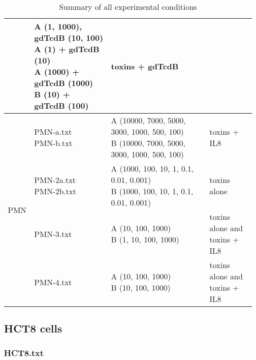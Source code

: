 \begin{table*}[t!]
\begin{center}
\begin{tabular}{ l l l l }
                          & \specialcell{ A (1, 1000), \\
                                          gdTcdB (10, 100) \\
                                          A (1) + gdTcdB (10) \\
                                          A (1000) + gdTcdB (1000) \\
                                          B (10) + gdTcdB (100) } & toxins + gdTcdB \\ \hline
   \multirow{8}{*}{PMN} & \specialcell{PMN-a.txt \\ PMN-b.txt} &
         \specialcell{A (10000, 7000, 5000, 3000, 1000, 500, 100) \\
                      B (10000, 7000, 5000, 3000, 1000, 500, 100) } & toxins + IL8 \\ \cline{2-4}
    & \specialcell{PMN-2a.txt \\ PMN-2b.txt} &
         \specialcell{A (1000, 100, 10, 1, 0.1, 0.01, 0.001) \\
                      B (1000, 100, 10, 1, 0.1, 0.01, 0.001) } & toxins alone \\ \cline{2-4}
    & PMN-3.txt &
         \specialcell{A (10, 100, 1000) \\
                      B (1, 10, 100, 1000) } & 
         \specialcell{ toxins alone and \\ toxins + IL8 } \\ \cline{2-4}
    & PMN-4.txt &
         \specialcell{A (10, 100, 1000) \\
                      B (10, 100, 1000) } & 
         \specialcell{ toxins alone and \\ toxins + IL8 } \\ \hline
   
\end{tabular}
\caption{Summary of all experimental conditions}
\end{center}
\end{table*}


\subsection{HCT8 cells}

\subsubsection{HCT8.txt}

